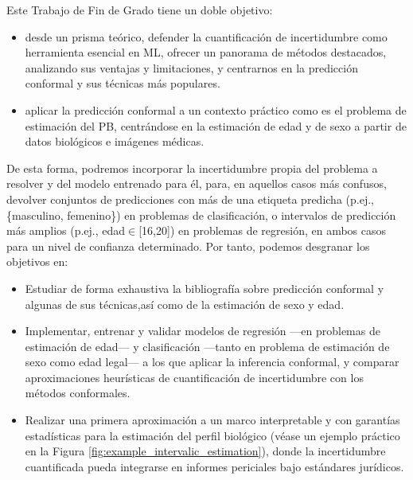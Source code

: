 Este Trabajo de Fin de Grado tiene un doble objetivo: 

\begin{itemize}

    \item desde un prisma teórico, defender la cuantificación de incertidumbre como herramienta esencial en \acrshort{ML}, ofrecer un panorama de métodos destacados, analizando sus ventajas y limitaciones, y centrarnos en la predicción conformal y sus técnicas más populares.

    \item aplicar la predicción conformal a un contexto práctico como es el problema de estimación del \acrshort{PB}, centrándose en la estimación de edad y de sexo a partir de datos biológicos e imágenes médicas.

\end{itemize}

De esta forma, podremos incorporar la incertidumbre propia del problema a resolver y del modelo entrenado para él, para, en aquellos casos más confusos, devolver conjuntos de predicciones con más de una etiqueta predicha (p.ej., \{masculino, femenino\}) en problemas de clasificación, o intervalos de predicción más amplios (p.ej., edad$\in$[16,20]) en problemas de regresión, en ambos casos para un nivel de confianza determinado.
Por tanto, podemos desgranar los objetivos en:

\begin{itemize}

    \item Estudiar de forma exhaustiva la bibliografía sobre predicción conformal y algunas de sus técnicas,así como de la estimación de sexo y edad.

    \item Implementar, entrenar y validar modelos de regresión ---en problemas de estimación de edad--- y clasificación ---tanto en problema de estimación de sexo como edad legal--- a los que aplicar la inferencia conformal, y comparar aproximaciones heurísticas de cuantificación de incertidumbre con los métodos conformales.
    

    \item Realizar una primera aproximación a un marco interpretable y con garantías estadísticas para la estimación del perfil biológico (véase un ejemplo práctico en la Figura \ref{fig:example_intervalic_estimation}), donde la incertidumbre cuantificada pueda integrarse en informes periciales bajo estándares jurídicos.

\end{itemize}


